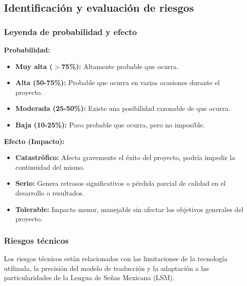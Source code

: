 \subsection{Identificación y evaluación de riesgos}
\subsubsection{Leyenda de probabilidad y efecto}
\textbf{Probabilidad:}
\begin{itemize}
	\item \textbf{Muy alta ($>$75\%):} Altamente probable que ocurra.
	\item \textbf{Alta (50-75\%):} Probable que ocurra en varias ocasiones durante el proyecto.
	\item \textbf{Moderada (25-50\%):} Existe una posibilidad razonable de que ocurra.
	\item \textbf{Baja (10-25\%):} Poco probable que ocurra, pero no imposible.
\end{itemize}

\textbf{Efecto (Impacto):}
\begin{itemize}
	\item \textbf{Catastrófico:} Afecta gravemente el éxito del proyecto, podría impedir la continuidad del mismo.
	\item \textbf{Serio:} Genera retrasos significativos o pérdida parcial de calidad en el desarrollo o resultados.
	\item \textbf{Tolerable:} Impacto menor, manejable sin afectar los objetivos generales del proyecto.
\end{itemize}


\subsubsection{Riesgos técnicos}
Los riesgos técnicos están relacionados con las limitaciones de la tecnología utilizada, la precisión del modelo de traducción y la adaptación a las particularidades de la Lengua de Señas Mexicana (LSM).

\setlength{\tabcolsep}{4pt}
\renewcommand{\arraystretch}{1.2}

